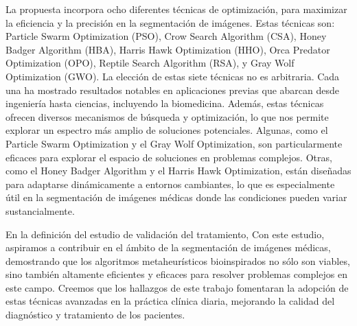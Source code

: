 \documentclass[conference]{IEEEtran}
\begin{document}
La propuesta incorpora ocho diferentes técnicas de optimización, para maximizar la eficiencia y la precisión en la segmentación de imágenes. Estas técnicas son: Particle Swarm Optimization (PSO), Crow Search Algorithm (CSA), Honey Badger Algorithm (HBA), Harris Hawk Optimization (HHO), Orca Predator Optimization (OPO), Reptile Search Algorithm (RSA), y Gray Wolf Optimization (GWO). 
La elección de estas siete técnicas no es arbitraria. Cada una ha mostrado resultados notables en aplicaciones previas que abarcan desde ingeniería hasta ciencias, incluyendo la biomedicina. Además, estas técnicas ofrecen diversos mecanismos de búsqueda y optimización, lo que nos permite explorar un espectro más amplio de soluciones potenciales. Algunas, como el Particle Swarm Optimization y el Gray Wolf Optimization, son particularmente eficaces para explorar el espacio de soluciones en problemas complejos. Otras, como el Honey Badger Algorithm y el Harris Hawk Optimization, están diseñadas para adaptarse dinámicamente a entornos cambiantes, lo que es especialmente útil en la segmentación de imágenes médicas donde las condiciones pueden variar sustancialmente.

En la definición del estudio de validación del tratamiento, Con este estudio, aspiramos a contribuir en el ámbito de la segmentación de imágenes médicas, demostrando que los algoritmos metaheurísticos bioinspirados no sólo son viables, sino también altamente eficientes y eficaces para resolver problemas complejos en este campo. Creemos que los hallazgos de este trabajo fomentaran la adopción de estas técnicas avanzadas en la práctica clínica diaria, mejorando la calidad del diagnóstico y tratamiento de los pacientes.





\end{document}
